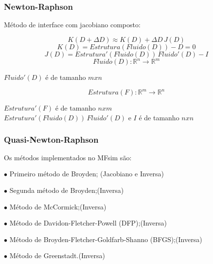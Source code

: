 \documentclass[xcolor=dvipsnames,10pt,aspectratio=169]{beamer}
\begin{document}
		
		\begin{frame}
			\frametitle{Newton-Raphson}
			
			\flushleft
			Método de interface com jacobiano composto:
			
			\centering
			\begin{equation}\label{forte_eqNewton}
			K(D+\Delta D) \approx K(D)+\Delta D \, J(D)
			\end{equation}
			\begin{equation}\label{forte_eqNewton2}
			K(D) =  Estrutura(Fluido(D))-D =  0
			\end{equation}
			\begin{equation}\label{forte_eqNewton3}
			J(D) =  Estrutura'(Fluido(D)) \, Fluido'(D)-I
			\end{equation}
			\begin{equation}\label{forte_eqNewton4}
			Fluido(D): \mathbb{R}^{n} \to \mathbb{R}^{m}
			\end{equation}
			
			\flushleft
			$Fluido'(D)$ é de tamanho $m x n$
			
			\centering
			
			\begin{equation}\label{forte_eqNewton5}
			Estrutura(F): \mathbb{R}^{m} \to \mathbb{R}^{n}
			\end{equation}
			
			\flushleft
			$Estrutura'(F)$ é de tamanho $n x m$\\
			$Estrutura'(Fluido(D)) \, Fluido'(D)$ e $I$ é de tamanho $n x n$
		\end{frame}
	
		\begin{frame}
			\frametitle{Quasi-Newton-Raphson}
				
				\flushleft
				Os métodos implementados no MFsim são:
				
				$\bullet$ Primeiro método de Broyden; (Jacobiano e Inversa)
				
				$\bullet$ Segunda método de Broyden;(Inversa)
				
				$\bullet$ Método de McCormick;(Inversa)
				
				$\bullet$ Método de Davidon-Fletcher-Powell (DFP);(Inversa)
				
				$\bullet$ Método de Broyden-Fletcher-Goldfarb-Shanno (BFGS);(Inversa)
				
				$\bullet$ Método de Greenstadt.(Inversa)
		\end{frame}
		
\end{document}
